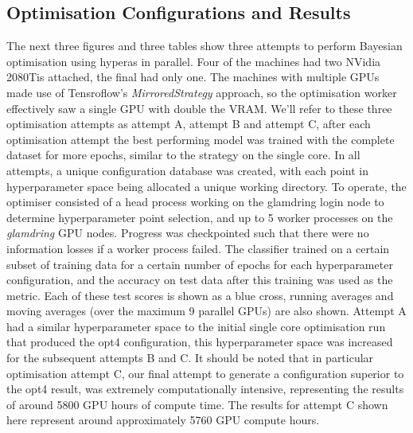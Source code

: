 \subsection{Optimisation Configurations and Results}
The next three figures and three tables show three attempts to perform Bayesian optimisation using hyperas in parallel. Four of the machines had two NVidia 2080Tis attached, the final had only one. The machines with multiple GPUs made use of Tensroflow's \textit{MirroredStrategy} approach, so the optimisation worker effectively saw a single GPU with double the VRAM. We'll refer to these three optimisation attempts as attempt A, attempt B and attempt C, after each optimisation attempt the best performing model was trained with the complete dataset for more epochs, similar to the strategy on the single core. In all attempts, a unique configuration database was created, with each point in hyperparameter space being allocated a unique working directory. To operate, the optimiser consisted of a head process working on the glamdring login node to determine hyperparameter point selection, and up to 5 worker processes on the \textit{glamdring} GPU nodes. Progress was checkpointed such that there were no information losses if a worker process failed. The classifier trained on a certain subset of training data for a certain number of epochs for each hyperparameter configuration, and the accuracy on test data after this training was used as the metric. Each of these test scores is shown as a blue cross, running averages and moving averages (over the maximum 9 parallel GPUs) are also shown. Attempt A had a similar hyperparameter space to the initial single core optimisation run that produced the opt4 configuration, this hyperparameter space was increased for the subsequent attempts B and C. It should be noted that in particular optimisation attempt C, our final attempt to generate a configuration superior to the opt4 result, was extremely computationally intensive, representing the results of around 5800 GPU hours of compute time. The results for attempt C shown here represent around approximately 5760 GPU compute hours.

